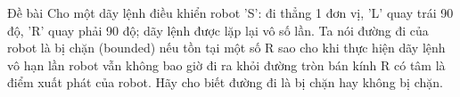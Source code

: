 Đề bài  
Cho một dãy lệnh điều khiển robot 'S': đi thẳng 1 đơn vị, 'L' quay trái 90 độ, 'R' quay phải 90 độ; dãy lệnh được lặp lại vô số lần. Ta nói đường đi của robot là bị chặn (bounded) nếu tồn tại một số R sao cho khi thực hiện dãy lệnh vô hạn lần robot vẫn không bao giờ đi ra khỏi đường tròn bán kính R có tâm là điểm xuất phát của robot. Hãy cho biết đường đi là bị chặn hay không bị chặn.